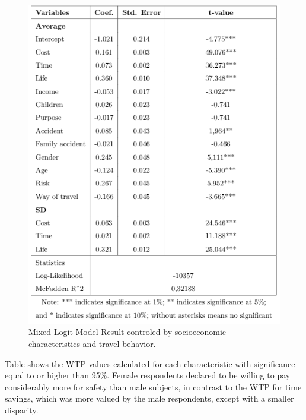\documentclass[]{elsarticle} %
\makeatletter
\def\maxwidth{\ifdim\Gin@nat@width>\linewidth\linewidth
\else\Gin@nat@width\fi}
\let\Oldincludegraphics\includegraphics
\renewcommand{\includegraphics}[1]{\Oldincludegraphics[width=\maxwidth]{#1}}
\makeatother
\begin{document}
\begin{figure}
\centering
\includegraphics{table16.png}
\caption{Mixed Logit Model Result controled by socioeconomic
characteristics and travel behavior.}
\end{figure}

Table shows the WTP values calculated for each characteristic with
significance equal to or higher than 95\%. Female respondents declared
to be willing to pay considerably more for safety than male subjects, in
contrast to the WTP for time savings, which was more valued by the male
respondents, except with a smaller disparity.
\end{document}
